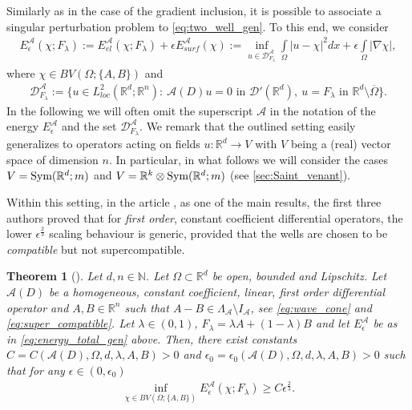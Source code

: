 \documentclass[a4paper, 10pt, twoside, notitlepage]{amsart}
\theoremstyle{plain}
\newtheorem{thm}{Theorem}
\newcommand{\R}{\mathbb{R}}
\newcommand{\N}{\mathbb{N}}
\newcommand{\A}{\mathcal{A}}
\renewcommand{\S}[1]{\textup{Sym}(\R^d;#1)}
\begin{document}
	Similarly as in the case of the gradient inclusion, it is possible to associate a singular perturbation problem to \cref{eq:two_well_gen}. To this end, we consider
	\begin{align}
		\label{eq:energy_total_gen}
		E_{\epsilon}^{\A}(\chi;F_\lambda):= E_{el}^{\A}(\chi; F_{\lambda}) + \epsilon E_{surf}^{\A}(\chi) :=  \inf\limits_{u\in \mathcal{D}_{F_{\lambda}}^{\A}} \int\limits_{\Omega}|u-\chi|^2 dx+ \epsilon \int\limits_{\Omega} |\nabla \chi|,
	\end{align}
	where $\chi \in BV(\Omega; \{A,B\})$ and
	\begin{align}
		\label{eq:admissible_gen}
		\mathcal{D}_{F_{\lambda}}^{\A} := \{u \in L^2_{loc}(\R^d;\R^n): \  \A(D)u = 0  \mbox{ in } \mathcal{D}'(\R^d), \ u= F_{\lambda} \mbox{ in } \R^d \setminus \overline{\Omega}\}.
	\end{align}
	In the following we will often omit the superscript $\A$ in the notation of the energy $E_\epsilon^\A$ and the set $\mathcal{D}_{F_\lambda}^{\A}$.
	We remark that the outlined setting easily generalizes to operators acting on fields $u:\R^d\to V$ with $V$ being a (real) vector space of dimension $n$.
	In particular, in what follows we will consider the cases $V=\S{m}$ and $V=\R^k\otimes\S{m}$ (see \cref{sec:Saint_venant}).
	
	
	Within this setting, in the article \cite{RRT23}, as one of the main results, the first three authors proved that for \emph{first order}, constant coefficient differential operators, the lower
	$\epsilon^{\frac{2}{3}}$ scaling behaviour is generic, provided that the wells are chosen to be \emph{compatible} but not supercompatible.
	
	
	\begin{thm}[{\cite[Theorem 1]{RRT23}}] \label{thm:FirstOrderScaling}
          Let $d,n \in \N$. Let $\Omega \subset \R^d$ be open, bounded and Lipschitz.  Let $\A(D)$ be a homogeneous, constant coefficient, linear, \emph{first order} differential operator
          and $A,B \in \R^n$ such that $A-B \in \Lambda_{\A} \setminus I_{\A}$, see \cref{eq:wave_cone} and \cref{eq:super_compatible}. Let $\lambda \in (0,1)$,
            $F_\lambda = \lambda A + (1-\lambda)B$ and let $E^{\A}_{\epsilon}$ be as in \cref{eq:energy_total_gen} above. Then, there exist constants $C=C(\A(D),\Omega,d,\lambda, A, B)>0$ and
          $\epsilon_0 = \epsilon_0(\A(D),\Omega,d,\lambda,A,B)>0$ such that for any $\epsilon \in (0,\epsilon_0)$
		\begin{align*}
			\inf\limits_{\chi \in BV(\Omega;\{A,B\})}  E_{\epsilon}^{\A}(\chi;F_\lambda) \geq C \epsilon^{\frac{2}{3}}.
		\end{align*}
	\end{thm}
	
\end{document}
